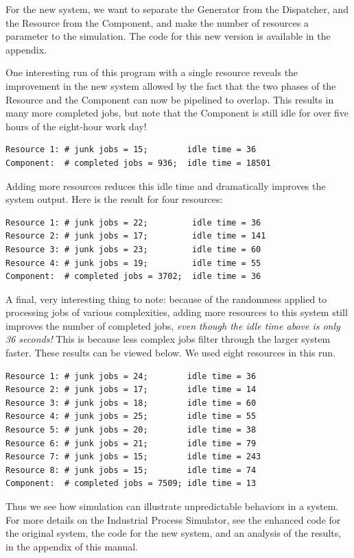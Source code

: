 \documentclass[10pt]{article}
\begin{document}
For the new system, we want to separate the Generator from the
Dispatcher, and the Resource from the Component, and make the number
of resources a parameter to the simulation.  The code for this new
version is available in the appendix.  

One interesting run of this program with a single resource reveals the
improvement in the new system allowed by the fact that the two phases
of the Resource and the Component can now be pipelined to overlap.
This results in many more completed jobs, but note that the Component
is still idle for over five hours of the eight-hour work day!

\begin{verbatim}
Resource 1: # junk jobs = 15;        idle time = 36
Component:  # completed jobs = 936;  idle time = 18501
\end{verbatim}

Adding more resources reduces this idle time and dramatically improves
the system output.  Here is the result for four resources:

\begin{verbatim}
Resource 1: # junk jobs = 22;         idle time = 36
Resource 2: # junk jobs = 17;         idle time = 141
Resource 3: # junk jobs = 23;         idle time = 60
Resource 4: # junk jobs = 19;         idle time = 55
Component:  # completed jobs = 3702;  idle time = 36
\end{verbatim}

A final, very interesting thing to note:  because of the randomness
applied to processing jobs of various complexities, adding more
resources to this system still improves the number of completed jobs,
{\it even though the idle time above is only 36 seconds!}  This is
because less complex jobs filter through the larger system faster.
These results can be viewed below.  We used eight resources in this
run.

\begin{verbatim}
Resource 1: # junk jobs = 24;        idle time = 36
Resource 2: # junk jobs = 17;        idle time = 14
Resource 3: # junk jobs = 18;        idle time = 60
Resource 4: # junk jobs = 25;        idle time = 55
Resource 5: # junk jobs = 20;        idle time = 38
Resource 6: # junk jobs = 21;        idle time = 79
Resource 7: # junk jobs = 15;        idle time = 243
Resource 8: # junk jobs = 15;        idle time = 74
Component:  # completed jobs = 7509; idle time = 13
\end{verbatim}

Thus we see how simulation can illustrate unpredictable behaviors in a
system.  For more details on the Industrial Process Simulator, see the
enhanced code for the original system, the code for the new system,
and an analysis of the results, in the appendix of this manual.
\end{document}
